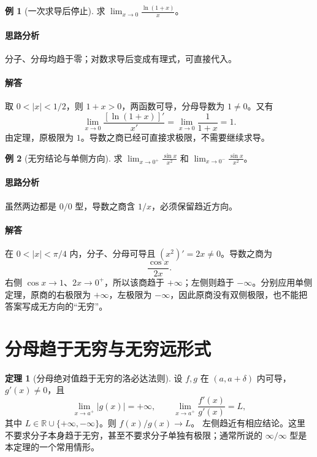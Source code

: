 \documentclass[UTF8,fontset=fandol,12pt,oneside,openany]{ctexrep}
\newcommand{\R}{\mathbb R}
\theoremstyle{definition}
\newtheorem{theorem}{定理}[chapter]
\newtheorem{example}{例}[chapter]
\begin{document}
\begin{example}[一次求导后停止]
求 $\displaystyle\lim_{x\to0}\frac{\ln(1+x)}x$。
\end{example}
\paragraph{思路分析}
分子、分母均趋于零；对数求导后变成有理式，可直接代入。
\paragraph{解答}
取 $0<|x|<1/2$，则 $1+x>0$，两函数可导，分母导数为 $1\ne0$。又有
\[
\lim_{x\to0}\frac{[\ln(1+x)]'}{x'}
=\lim_{x\to0}\frac1{1+x}=1.
\]
由定理，原极限为 $1$。导数之商已经可直接求极限，不需要继续求导。

\begin{example}[无穷结论与单侧方向]
求 $\displaystyle\lim_{x\to0^+}\frac{\sin x}{x^2}$ 和 $\displaystyle\lim_{x\to0^-}\frac{\sin x}{x^2}$。
\end{example}
\paragraph{思路分析}
虽然两边都是 $0/0$ 型，导数之商含 $1/x$，必须保留趋近方向。
\paragraph{解答}
在 $0<|x|<\pi/4$ 内，分子、分母可导且 $(x^2)'=2x\ne0$。导数之商为
\[
\frac{\cos x}{2x}.
\]
右侧 $\cos x\to1$、$2x\to0^+$，所以该商趋于 $+\infty$；左侧则趋于 $-\infty$。分别应用单侧定理，原商的右极限为 $+\infty$，左极限为 $-\infty$，因此原商没有双侧极限，也不能把答案写成无方向的“无穷”。

\section{分母趋于无穷与无穷远形式}
\label{lec:07:infinity}

\begin{theorem}[分母绝对值趋于无穷的洛必达法则]
\label{lec:07:infinity-theorem}
设 $f,g$ 在 $(a,a+\delta)$ 内可导，$g'(x)\ne0$，且
\[
\lim_{x\to a^+}|g(x)|=+\infty,
\qquad
\lim_{x\to a^+}\frac{f'(x)}{g'(x)}=L,
\]
其中 $L\in\R\cup\{+\infty,-\infty\}$。则 $f(x)/g(x)\to L$。
左侧趋近有相应结论。这里不要求分子本身趋于无穷，甚至不要求分子单独有极限；通常所说的 $\infty/\infty$ 型是本定理的一个常用情形。
\end{theorem}
\end{document}
